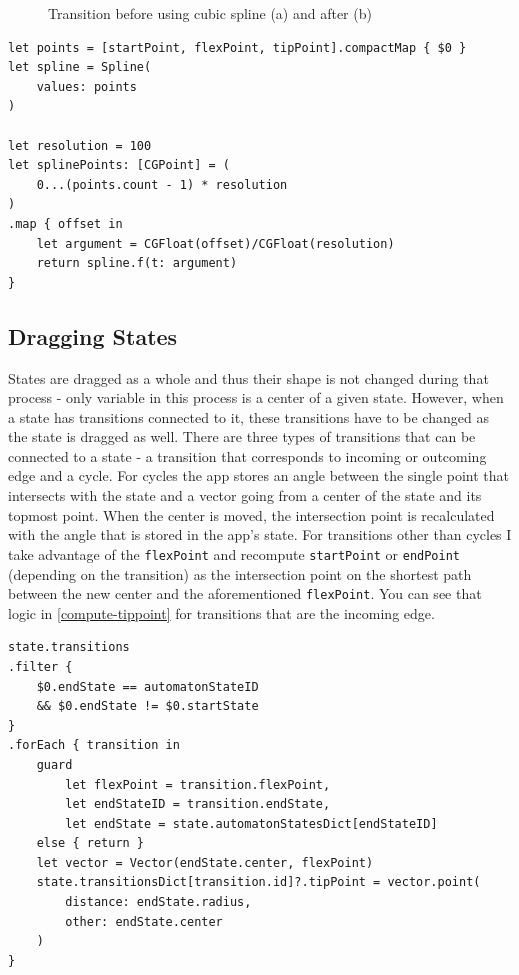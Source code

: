 \begin{figure}
    \centering
    \caption{Transition before using cubic spline (a) and after (b)}\label{spline}
\end{figure}

\begin{lstlisting}[caption={Creating spline points}, label=spline-code]
let points = [startPoint, flexPoint, tipPoint].compactMap { $0 }
let spline = Spline(
    values: points
)

let resolution = 100
let splinePoints: [CGPoint] = (
    0...(points.count - 1) * resolution
)
.map { offset in
    let argument = CGFloat(offset)/CGFloat(resolution)
    return spline.f(t: argument)
}
\end{lstlisting}

\subsection{Dragging States}

States are dragged as a whole and thus their shape is not changed during that process - only variable in this process is a center of a given state. However, when a state has transitions connected to it, these transitions have to be changed as the state is dragged as well. There are three types of transitions that can be connected to a state - a transition that corresponds to incoming or outcoming edge and a cycle. For cycles the app stores an angle between the single point that intersects with the state and a vector going from a center of the state and its topmost point. When the center is moved, the intersection point is recalculated with the angle that is stored in the app's state. For transitions other than cycles I take advantage of the \lstinline{flexPoint} and recompute \lstinline{startPoint} or \lstinline{endPoint} (depending on the transition) as the intersection point on the shortest path between the new center and the aforementioned \lstinline{flexPoint}. You can see that logic in \ref{compute-tippoint} for transitions that are the incoming edge.

\begin{lstlisting}[caption={Calculation of new \lstinline{tipPoint}}, label=compute-tippoint]
state.transitions
.filter { 
    $0.endState == automatonStateID 
    && $0.endState != $0.startState 
}
.forEach { transition in
    guard
        let flexPoint = transition.flexPoint,
        let endStateID = transition.endState,
        let endState = state.automatonStatesDict[endStateID]
    else { return }
    let vector = Vector(endState.center, flexPoint)
    state.transitionsDict[transition.id]?.tipPoint = vector.point(
        distance: endState.radius, 
        other: endState.center
    )
}
\end{lstlisting}
 
